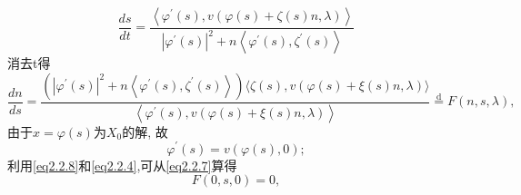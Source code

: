 \begin{equation*}
\frac{d s}{d t}=\frac{\left\langle\varphi^{\prime}(s), v(\varphi(s)+\zeta(s) n, \lambda)\right\rangle}{\left|\varphi^{\prime}(s)\right|^{2}+n\left\langle\varphi^{\prime}(s), \zeta^{\prime}(s)\right\rangle}
\end{equation*}
消去t得
\begin{equation}
  \frac{d n}{d s}=
  \frac{\left(\left|\varphi^{\prime}(s)\right|^{2}+n\left\langle\varphi^{\prime}(s), \zeta^{\prime}(s)\right\rangle\right)\langle\zeta(s), v(\varphi(s)+\xi(s) n, \lambda)\rangle}{\left\langle\varphi^{\prime}(s), v(\varphi(s)+\xi(s) n, \lambda)\right\rangle}
  \stackrel{\mathrm{d}}{=} F(n, s, \lambda),
\end{equation}
由于\(x=\varphi(s)\)为\(X_{0}\)的解,
故
\begin{equation}
  \varphi^{\prime}(s)=v(\varphi(s), 0);
  \label{eq2.2.8}
\end{equation}
利用\eqref{eq2.2.8}和\eqref{eq2.2.4},可从\eqref{eq2.2.7}算得
\begin{equation*}
F(0, s, 0)=0,
\end{equation*}

